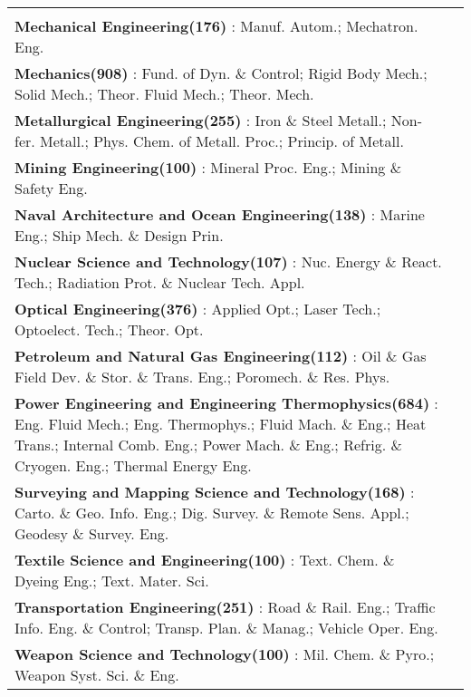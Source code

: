 {\begin{table}[p]
{\begin{tabular}{>{\raggedright\arraybackslash}p{3.5cm}>{\raggedright\arraybackslash}p{17cm}}
\begin{minipage}[t]{17cm}
\begin{mybox}[colback=blue!20, coltext=black, height=22cm]{}
Engineering(289)}} : Mater. Phys. \& Chem.; Mater. Proc. Eng.\\\textbf{\textcolor{blue!60!black!60}{Mechanical Engineering(176)}} : Manuf. Autom.; Mechatron. Eng.\\\textbf{\textcolor{blue!60!black!60}{Mechanics(908)}} : Fund. of Dyn. \& Control; Rigid Body Mech.; Solid Mech.; Theor. Fluid Mech.; Theor. Mech.\\\textbf{\textcolor{blue!60!black!60}{Metallurgical Engineering(255)}} : Iron \& Steel Metall.; Non-fer. Metall.; Phys. Chem. of Metall. Proc.; Princip. of Metall.\\\textbf{\textcolor{blue!60!black!60}{Mining Engineering(100)}} : Mineral Proc. Eng.; Mining \& Safety Eng.\\\textbf{\textcolor{blue!60!black!60}{Naval Architecture and Ocean Engineering(138)}} : Marine Eng.; Ship Mech. \& Design Prin.\\\textbf{\textcolor{blue!60!black!60}{Nuclear Science and Technology(107)}} : Nuc. Energy \& React. Tech.; Radiation Prot. \& Nuclear Tech. Appl.\\\textbf{\textcolor{blue!60!black!60}{Optical Engineering(376)}} : Applied Opt.; Laser Tech.; Optoelect. Tech.; Theor. Opt.\\\textbf{\textcolor{blue!60!black!60}{Petroleum and Natural Gas Engineering(112)}} : Oil \& Gas Field Dev. \& Stor. \& Trans. Eng.; Poromech. \& Res. Phys.\\\textbf{\textcolor{blue!60!black!60}{Power Engineering and Engineering Thermophysics(684)}} : Eng. Fluid Mech.; Eng. Thermophys.; Fluid Mach. \& Eng.; Heat Trans.; Internal Comb. Eng.; Power Mach. \& Eng.; Refrig. \& Cryogen. Eng.; Thermal Energy Eng.\\\textbf{\textcolor{blue!60!black!60}{Surveying and Mapping Science and Technology(168)}} : Carto. \& Geo. Info. Eng.; Dig. Survey. \& Remote Sens. Appl.; Geodesy \& Survey. Eng.\\\textbf{\textcolor{blue!60!black!60}{Textile Science and Engineering(100)}} : Text. Chem. \& Dyeing Eng.; Text. Mater. Sci.\\\textbf{\textcolor{blue!60!black!60}{Transportation Engineering(251)}} : Road \& Rail. Eng.; Traffic Info. Eng. \& Control; Transp. Plan. \& Manag.; Vehicle Oper. Eng.\\\textbf{\textcolor{blue!60!black!60}{Weapon Science and Technology(100)}} : Mil. Chem. \& Pyro.; Weapon Syst. Sci. \& Eng.\end{mybox}
\end{minipage}\\

\end{tabular}}
\end{table}}
